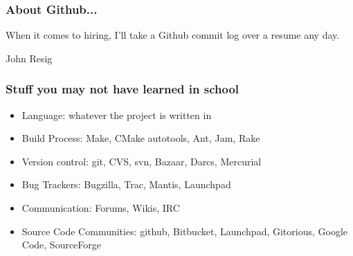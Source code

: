 \documentclass{beamer}
\begin{document}
\begin{frame}
  \frametitle{About Github...}
    \begin{Large}
      When it comes to hiring, I'll take a Github commit log over a
      resume any day.
      \begin{flushright}
        \textemdash{}John Resig
      \end{flushright}

    \end{Large}
\end{frame}

\begin{frame}
  \frametitle{Stuff you may not have learned in school}
    \begin{itemize}[<+->]
    \item Language: whatever the project is written in
    \item Build Process: Make, CMake autotools, Ant, Jam, Rake
    \item Version control: git, CVS, svn, Bazaar, Darcs, Mercurial
    \item Bug Trackers: Bugzilla, Trac, Mantis, Launchpad
    \item Communication: Forums, Wikis, IRC
    \item Source Code Communities: github, Bitbucket, Launchpad,
      Gitorious, Google Code, SourceForge
    \end{itemize}
\end{frame}

\end{document}
